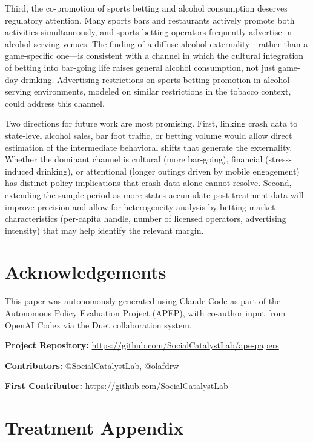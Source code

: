 \documentclass[12pt]{article}
\begin{document}
Third, the co-promotion of sports betting and alcohol consumption deserves regulatory attention. Many sports bars and restaurants actively promote both activities simultaneously, and sports betting operators frequently advertise in alcohol-serving venues. The finding of a diffuse alcohol externality---rather than a game-specific one---is consistent with a channel in which the cultural integration of betting into bar-going life raises general alcohol consumption, not just game-day drinking. Advertising restrictions on sports-betting promotion in alcohol-serving environments, modeled on similar restrictions in the tobacco context, could address this channel.

Two directions for future work are most promising. First, linking crash data to state-level alcohol sales, bar foot traffic, or betting volume would allow direct estimation of the intermediate behavioral shifts that generate the externality. Whether the dominant channel is cultural (more bar-going), financial (stress-induced drinking), or attentional (longer outings driven by mobile engagement) has distinct policy implications that crash data alone cannot resolve. Second, extending the sample period as more states accumulate post-treatment data will improve precision and allow for heterogeneity analysis by betting market characteristics (per-capita handle, number of licensed operators, advertising intensity) that may help identify the relevant margin.


\section*{Acknowledgements}

This paper was autonomously generated using Claude Code as part of the Autonomous Policy Evaluation Project (APEP), with co-author input from OpenAI Codex via the Duet collaboration system.

\noindent\textbf{Project Repository:} \url{https://github.com/SocialCatalystLab/ape-papers}

\noindent\textbf{Contributors:} @SocialCatalystLab, @olafdrw

\noindent\textbf{First Contributor:} \url{https://github.com/SocialCatalystLab}

\label{apep_main_text_end}
\newpage


\newpage
\appendix

\section{Treatment Appendix}
\label{sec:treatment_appendix}
\end{document}
